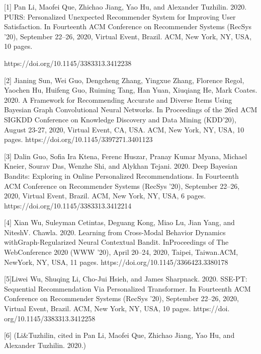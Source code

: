 \documentclass[english,twoside,censored,tkt,sw-line]{HYthesisML}
\begin{document}
\newpage
\mytableofcontents
\frontmatter
\mainmatter

{}  
\printbibliography

[1] Pan Li, Maofei Que, Zhichao Jiang, Yao Hu, and Alexander Tuzhilin. 2020. PURS: Personalized Unexpected Recommender System for Improving User Satisfaction. In Fourteenth ACM Conference on Recommender Systems (RecSys ’20), September 22–26, 2020, Virtual Event, Brazil. ACM, New York, NY, USA, 10 pages.
\begin{sloppypar}
https://doi.org/10.1145/3383313.3412238
\end{sloppypar}

[2] Jianing Sun, Wei Guo, Dengcheng Zhang, Yingxue Zhang, Florence Regol, Yaochen Hu, Huifeng Guo, Ruiming Tang, Han Yuan, Xiuqiang He, Mark Coates. 2020. A Framework for Recommending Accurate and Diverse Items Using Bayesian Graph Convolutional Neural Networks. In Proceedings of the 26rd ACM SIGKDD Conference on Knowledge Discovery and Data Mining (KDD’20), August 23-27, 2020, Virtual Event, CA, USA. ACM, New York, NY, USA, 10 pages. https://doi.org/10.1145/3397271.3401123

[3] Dalin Guo, Sofia Ira Ktena, Ferenc Huszar, Pranay Kumar Myana, Michael Kneier, Sourav Das, Wenzhe Shi, and Alykhan Tejani. 2020. Deep Bayesian Bandits: Exploring in Online Personalized Recommendations. In Fourteenth ACM Conference on Recommender Systems (RecSys ’20), September 22–26, 2020, Virtual Event, Brazil. ACM, New York, NY, USA, 6 pages. https://doi.org/10.1145/3383313.3412214

[4] Xian Wu, Suleyman Cetintas, Deguang Kong, Miao Lu, Jian Yang, and NiteshV. Chawla. 2020. Learning from Cross-Modal Behavior Dynamics withGraph-Regularized Neural Contextual Bandit. InProceedings of The WebConference 2020 (WWW ’20), April 20–24, 2020, Taipei, Taiwan.ACM, NewYork, NY, USA, 11 pages.
\newline
https://doi.org/10.1145/3366423.3380178

[5]Liwei Wu, Shuqing Li, Cho-Jui Hsieh, and James Sharpnack. 2020. SSE-PT:
Sequential Recommendation Via Personalized Transformer. In Fourteenth
ACM Conference on Recommender Systems (RecSys ’20), September 22–26,
2020, Virtual Event, Brazil. ACM, New York, NY, USA, 10 pages. https://doi.
org/10.1145/3383313.3412258

[6] (Li\&Tuzhilin, cited in Pan Li, Maofei Que, Zhichao Jiang, Yao Hu, and Alexander Tuzhilin. 2020.) 
\end{document}
